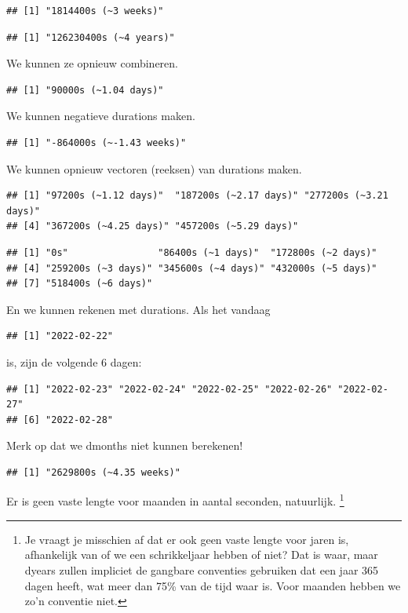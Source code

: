 \documentclass[]{tufte-book}
\begin{document}
\begin{verbatim}
## [1] "1814400s (~3 weeks)"
\end{verbatim}

\begin{verbatim}
## [1] "126230400s (~4 years)"
\end{verbatim}

We kunnen ze opnieuw combineren.

\begin{verbatim}
## [1] "90000s (~1.04 days)"
\end{verbatim}

We kunnen negatieve durations maken.

\begin{verbatim}
## [1] "-864000s (~-1.43 weeks)"
\end{verbatim}

We kunnen opnieuw vectoren (reeksen) van durations maken.

\begin{verbatim}
## [1] "97200s (~1.12 days)"  "187200s (~2.17 days)" "277200s (~3.21 days)"
## [4] "367200s (~4.25 days)" "457200s (~5.29 days)"
\end{verbatim}

\begin{verbatim}
## [1] "0s"                "86400s (~1 days)"  "172800s (~2 days)"
## [4] "259200s (~3 days)" "345600s (~4 days)" "432000s (~5 days)"
## [7] "518400s (~6 days)"
\end{verbatim}

En we kunnen rekenen met durations. Als het vandaag

\begin{verbatim}
## [1] "2022-02-22"
\end{verbatim}

is, zijn de volgende 6 dagen:

\begin{verbatim}
## [1] "2022-02-23" "2022-02-24" "2022-02-25" "2022-02-26" "2022-02-27"
## [6] "2022-02-28"
\end{verbatim}

Merk op dat we dmonths niet kunnen berekenen!

\begin{verbatim}
## [1] "2629800s (~4.35 weeks)"
\end{verbatim}

Er is geen vaste lengte voor maanden in aantal seconden, natuurlijk. \footnote{Je vraagt je misschien af dat er ook geen vaste lengte voor jaren is, afhankelijk van of we een schrikkeljaar hebben of niet? Dat is waar, maar dyears zullen impliciet de gangbare conventies gebruiken dat een jaar 365 dagen heeft, wat meer dan 75\% van de tijd waar is. Voor maanden hebben we zo'n conventie niet.}
\end{document}
